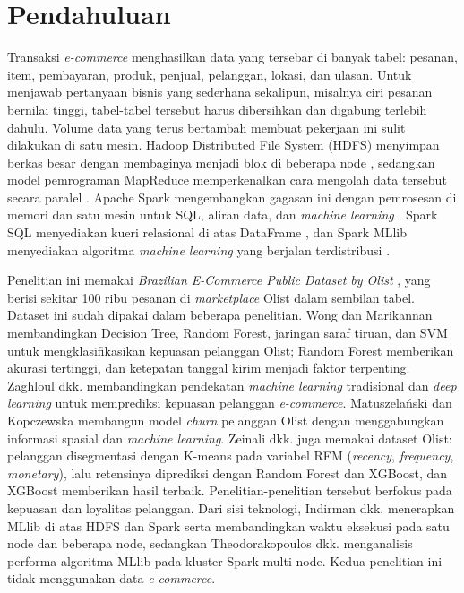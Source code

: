 \documentclass[11pt,a4paper]{article}
\begin{document}
\section{Pendahuluan}
Transaksi \emph{e-commerce} menghasilkan data yang tersebar di banyak tabel: pesanan,
item, pembayaran, produk, penjual, pelanggan, lokasi, dan ulasan. Untuk menjawab
pertanyaan bisnis yang sederhana sekalipun, misalnya ciri pesanan bernilai tinggi,
tabel-tabel tersebut harus dibersihkan dan digabung terlebih dahulu. Volume data yang
terus bertambah membuat pekerjaan ini sulit dilakukan di satu mesin. Hadoop Distributed
File System (HDFS) menyimpan berkas besar dengan membaginya menjadi blok di beberapa
node \cite{shvachko2010}, sedangkan model pemrograman MapReduce memperkenalkan cara
mengolah data tersebut secara paralel \cite{dean2008}. Apache Spark mengembangkan
gagasan ini dengan pemrosesan di memori dan satu mesin untuk SQL, aliran data, dan
\emph{machine learning} \cite{zaharia2016}. Spark SQL menyediakan kueri relasional di
atas DataFrame \cite{armbrust2015}, dan Spark MLlib menyediakan algoritma
\emph{machine learning} yang berjalan terdistribusi \cite{meng2016}.

Penelitian ini memakai \emph{Brazilian E-Commerce Public Dataset by Olist}
\cite{olist2018}, yang berisi sekitar 100 ribu pesanan di \emph{marketplace} Olist
dalam sembilan tabel. Dataset ini sudah dipakai dalam beberapa penelitian. Wong dan
Marikannan \cite{wong2020} membandingkan Decision Tree, Random Forest, jaringan saraf
tiruan, dan SVM untuk mengklasifikasikan kepuasan pelanggan Olist; Random Forest
memberikan akurasi tertinggi, dan ketepatan tanggal kirim menjadi faktor terpenting.
Zaghloul dkk. \cite{zaghloul2024} membandingkan pendekatan \emph{machine learning}
tradisional dan \emph{deep learning} untuk memprediksi kepuasan pelanggan
\emph{e-commerce}. Matuszelański dan Kopczewska \cite{matuszelanski2022} membangun
model \emph{churn} pelanggan Olist dengan menggabungkan informasi spasial dan
\emph{machine learning}. Zeinali dkk. \cite{zeinali2026} juga memakai dataset Olist:
pelanggan disegmentasi dengan K-means pada variabel RFM (\emph{recency}, \emph{frequency},
\emph{monetary}), lalu retensinya diprediksi dengan Random Forest dan XGBoost, dan XGBoost
memberikan hasil terbaik. Penelitian-penelitian tersebut berfokus pada kepuasan dan
loyalitas pelanggan. Dari sisi teknologi, Indirman dkk. \cite{indirman2023} menerapkan
MLlib di atas HDFS dan Spark serta membandingkan waktu eksekusi pada satu node dan
beberapa node, sedangkan Theodorakopoulos dkk. \cite{theodorakopoulos2025} menganalisis
performa algoritma MLlib pada kluster Spark multi-node. Kedua penelitian ini tidak
menggunakan data \emph{e-commerce}.
\end{document}
